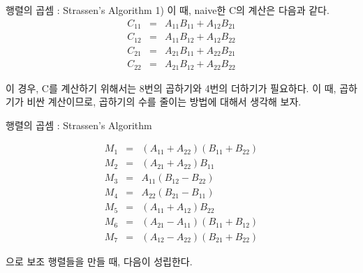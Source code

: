 \documentclass{beamer}
\begin{document}
\begin{frame}{행렬의 곱셈 : Strassen's Algorithm} 
1) 이 때, naive한 C의 계산은 다음과 같다. 
\begin{eqnarray} 
C_{11} & = & A_{11}B_{11} + A_{12}B_{21} \\
C_{12} & = & A_{11}B_{12} + A_{12}B_{22} \\
C_{21} & = & A_{21}B_{11} + A_{22}B_{21} \\
C_{22} & = & A_{21}B_{12} + A_{22}B_{22} 
\end{eqnarray}

이 경우, C를 계산하기 위해서는 8번의 곱하기와 4번의 더하기가 필요하다. 이 때, 곱하기가 비싼 계산이므로, 곱하기의 수를 줄이는 방법에 대해서 생각해 보자. 

\end{frame}



\begin{frame}{행렬의 곱셈 : Strassen's Algorithm} 

\begin{eqnarray} 
M_1 & = & (A_{11} + A_{22}) (B_{11} + B_{22}) \\
M_2 & = & (A_{21} + A_{22}) B_{11} \\
M_3 & = & A_{11} (B_{12} - B_{22}) \\
M_4 & = & A_{22} (B_{21} - B_{11}) \\
M_5 & = & (A_{11} + A_{12}) B_{22} \\
M_6 & = & (A_{21} - A_{11}) (B_{11} + B_{12}) \\
M_7 & = & (A_{12} - A_{22}) (B_{21} + B_{22}) 
\end{eqnarray}


으로 보조 행렬들을 만들 때, 다음이 성립한다. 
\end{frame}
\end{document}

